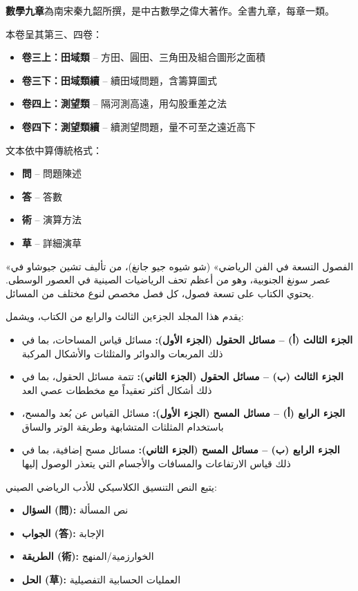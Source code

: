 \documentclass[11pt,a4paper]{article}
\begin{document}
\noindent
\begin{minipage}[t]{0.48\textwidth}
\textbf{數學九章}為南宋秦九韶所撰，是中古數學之偉大著作。全書九章，每章一類。

本卷呈其第三、四卷：
\begin{itemize}[leftmargin=1.5em]
  \item \textbf{卷三上：田域類} -- 方田、圓田、三角田及組合圖形之面積
  \item \textbf{卷三下：田域類續} -- 續田域問題，含籌算圖式
  \item \textbf{卷四上：測望類} -- 隔河測高遠，用勾股重差之法
  \item \textbf{卷四下：測望類續} -- 續測望問題，量不可至之遠近高下
\end{itemize}

文本依中算傳統格式：
\begin{itemize}[leftmargin=1.5em]
  \item \textbf{問} -- 問題陳述
  \item \textbf{答} -- 答數
  \item \textbf{術} -- 演算方法
  \item \textbf{草} -- 詳細演草
\end{itemize}
\end{minipage}
\hfill
\begin{minipage}[t]{0.48\textwidth}
\arabicfont\beginR
«الفصول التسعة في الفن الرياضي» (شو شيوه جيو جانغ)،
من تأليف تشين جيوشاو في عصر سونغ الجنوبية،
وهو من أعظم تحف الرياضيات الصينية في العصور الوسطى. يحتوي الكتاب
على تسعة فصول، كل فصل مخصص لنوع مختلف من المسائل.

يقدم هذا المجلد الجزءين الثالث والرابع من الكتاب، ويشمل:
\begin{itemize}[leftmargin=1.5em]
  \item \textbf{الجزء الثالث (أ) -- مسائل الحقول (الجزء الأول):} مسائل قياس المساحات، بما في ذلك المربعات والدوائر والمثلثات والأشكال المركبة
  \item \textbf{الجزء الثالث (ب) -- مسائل الحقول (الجزء الثاني):} تتمة مسائل الحقول، بما في ذلك أشكال أكثر تعقيداً مع مخططات عصي العد
  \item \textbf{الجزء الرابع (أ) -- مسائل المسح (الجزء الأول):} مسائل القياس عن بُعد والمسح، باستخدام المثلثات المتشابهة وطريقة الوتر والساق
  \item \textbf{الجزء الرابع (ب) -- مسائل المسح (الجزء الثاني):} مسائل مسح إضافية، بما في ذلك قياس الارتفاعات والمسافات والأجسام التي يتعذر الوصول إليها
\end{itemize}

يتبع النص التنسيق الكلاسيكي للأدب الرياضي الصيني:
\begin{itemize}[leftmargin=1.5em]
  \item \textbf{السؤال (問):} نص المسألة
  \item \textbf{الجواب (答):} الإجابة
  \item \textbf{الطريقة (術):} الخوارزمية/المنهج
  \item \textbf{الحل (草):} العمليات الحسابية التفصيلية
\end{itemize}
\endR
\end{minipage}
\end{document}
